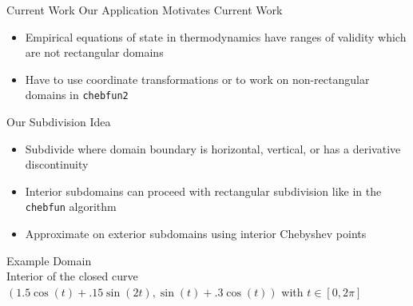 \documentclass[final]{beamer}
\begin{document}
\begin{frame}{}
\begin{columns}[t]
\begin{column}{.31\linewidth}
\begin{block}{Current Work}
{\color{numhypRed} Our Application Motivates Current Work}
\begin{itemize}
\item Empirical equations of state in thermodynamics have ranges of validity which are not rectangular domains
\item Have to use coordinate transformations \cite{townsend_2013-2} or to work on non-rectangular domains in {\tt chebfun2} 
\end{itemize}
{\color{numhypRed} Our Subdivision Idea}
\begin{itemize}
\item Subdivide where domain boundary is horizontal, vertical, or has a derivative discontinuity
\item Interior subdomains can proceed with rectangular subdivision like in the {\tt chebfun} algorithm
\item Approximate on exterior subdomains using interior Chebyshev points
\end{itemize}

{\color{numhypRed} Example Domain}\\
Interior of the closed curve $(1.5\cos(t) + .15\sin(2t), \sin(t) + .3\cos(t))$ with $t\in[0,2\pi]$

\begin{figure}
\captionsetup[subfigure]{justification=centering}
\centering
\begin{minipage}{.48\linewidth}
\end{minipage}
\end{figure}
\end{block}
\end{column}
\end{columns}
\end{frame}
\end{document}
